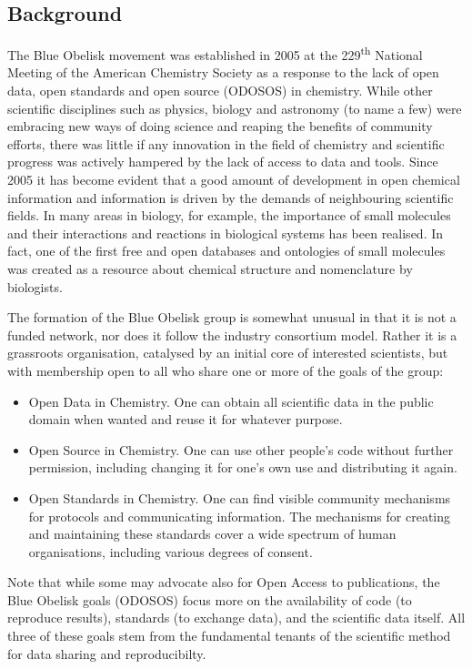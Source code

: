 \documentclass[10pt]{bmc_article}
\newenvironment{bmcformat}{\begin{raggedright}\baselineskip20pt\sloppy\setboolean{publ}{false}}{\end{raggedright}\baselineskip20pt\sloppy}
\begin{document}
\begin{bmcformat}
\section*{Background}
The Blue Obelisk movement was established in 2005 at the
229\textsuperscript{th} National Meeting of the American Chemistry
Society as a response to the lack of open data, open standards and
open source (ODOSOS) in chemistry. While other scientific disciplines
such as physics, biology and astronomy (to name a few) were embracing
new ways of doing science and reaping the benefits of community
efforts, there was little if any innovation in the field of chemistry
and scientific progress was actively hampered by the lack of access to
data and tools.
Since 2005 it has become evident that a good amount of development in open
chemical information and information is driven by the demands of neighbouring
scientific fields. In many areas in biology, for example, the importance of
small molecules and their interactions and reactions in biological systems
has been realised. In fact, one of the first free and open databases and ontologies
of small molecules was created as a resource about chemical structure and nomenclature
by biologists.\cite{DeMatos:2009p3839}

The formation of the Blue Obelisk group is somewhat unusual in that it
is not a funded network, nor does it follow the industry consortium
model. Rather it is a grassroots organisation, catalysed by an initial
core of interested scientists, but with membership open to all who
share one or more of the goals of the group:
\begin{itemize}
\item Open Data in Chemistry. One can obtain all scientific data in the public domain when
wanted and reuse it for whatever purpose.
\item Open Source in Chemistry. One can use other people's code without further
permission, including changing it for one's own use and distributing
it again.
\item Open Standards in Chemistry. One can find visible community mechanisms for
protocols and communicating information. The mechanisms for creating
and maintaining these standards cover a wide spectrum of human
organisations, including various degrees of consent.
\end{itemize}

Note that while some may advocate also for Open Access to
publications, the Blue Obelisk goals (ODOSOS) focus more on the availability of code (to
reproduce results), standards (to exchange data), and the scientific
data itself. All three of these goals stem from the fundamental
tenants of the scientific method for data sharing and reproducibilty.


\end{bmcformat}
\end{document}
